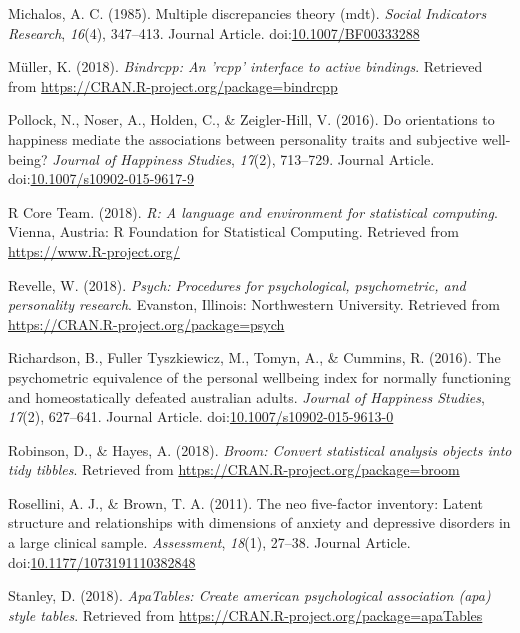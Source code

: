 \documentclass[man,floatsintext]{apa6}
\theoremstyle{definition}
\theoremstyle{definition}
\theoremstyle{definition}
\theoremstyle{remark}
\begin{document}
\hypertarget{ref-RN569}{}
Michalos, A. C. (1985). Multiple discrepancies theory (mdt).
\emph{Social Indicators Research}, \emph{16}(4), 347--413. Journal
Article.
doi:\href{https://doi.org/10.1007/BF00333288}{10.1007/BF00333288}

\hypertarget{ref-R-bindrcpp}{}
Müller, K. (2018). \emph{Bindrcpp: An 'rcpp' interface to active
bindings}. Retrieved from
\url{https://CRAN.R-project.org/package=bindrcpp}

\hypertarget{ref-RN301}{}
Pollock, N., Noser, A., Holden, C., \& Zeigler-Hill, V. (2016). Do
orientations to happiness mediate the associations between personality
traits and subjective well-being? \emph{Journal of Happiness Studies},
\emph{17}(2), 713--729. Journal Article.
doi:\href{https://doi.org/10.1007/s10902-015-9617-9}{10.1007/s10902-015-9617-9}

\hypertarget{ref-R-base}{}
R Core Team. (2018). \emph{R: A language and environment for statistical
computing}. Vienna, Austria: R Foundation for Statistical Computing.
Retrieved from \url{https://www.R-project.org/}

\hypertarget{ref-R-psych}{}
Revelle, W. (2018). \emph{Psych: Procedures for psychological,
psychometric, and personality research}. Evanston, Illinois:
Northwestern University. Retrieved from
\url{https://CRAN.R-project.org/package=psych}

\hypertarget{ref-RN383}{}
Richardson, B., Fuller Tyszkiewicz, M., Tomyn, A., \& Cummins, R.
(2016). The psychometric equivalence of the personal wellbeing index for
normally functioning and homeostatically defeated australian adults.
\emph{Journal of Happiness Studies}, \emph{17}(2), 627--641. Journal
Article.
doi:\href{https://doi.org/10.1007/s10902-015-9613-0}{10.1007/s10902-015-9613-0}

\hypertarget{ref-R-broom}{}
Robinson, D., \& Hayes, A. (2018). \emph{Broom: Convert statistical
analysis objects into tidy tibbles}. Retrieved from
\url{https://CRAN.R-project.org/package=broom}

\hypertarget{ref-RN572}{}
Rosellini, A. J., \& Brown, T. A. (2011). The neo five-factor inventory:
Latent structure and relationships with dimensions of anxiety and
depressive disorders in a large clinical sample. \emph{Assessment},
\emph{18}(1), 27--38. Journal Article.
doi:\href{https://doi.org/10.1177/1073191110382848}{10.1177/1073191110382848}

\hypertarget{ref-R-apaTables}{}
Stanley, D. (2018). \emph{ApaTables: Create american psychological
association (apa) style tables}. Retrieved from
\url{https://CRAN.R-project.org/package=apaTables}
\end{document}
